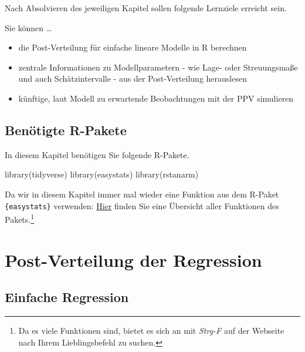 \documentclass[
  a4paper,
  DIV=11]{scrreprt}
\newenvironment{Shaded}{\begin{snugshade}}{\end{snugshade}}
\newcommand{\FunctionTok}[1]{\textcolor[rgb]{0.28,0.35,0.67}{#1}}
\newcommand{\NormalTok}[1]{\textcolor[rgb]{0.00,0.23,0.31}{#1}}
\providecommand{\tightlist}{%
  \setlength{\itemsep}{0pt}\setlength{\parskip}{0pt}}\usepackage{longtable,booktabs,array}
\theoremstyle{definition}
\theoremstyle{remark}
\begin{document}
Nach Absolvieren des jeweiligen Kapitel sollen folgende Lernziele
erreicht sein.

Sie können \ldots{}

\begin{itemize}
\tightlist
\item
  die Post-Verteilung für einfache lineare Modelle in R berechnen
\item
  zentrale Informationen zu Modellparametern - wie Lage- oder
  Streuungsmaße und auch Schätzintervalle - aus der Post-Verteilung
  herauslesen
\item
  künftige, laut Modell zu erwartende Beobachtungen mit der PPV
  simulieren
\end{itemize}

\hypertarget{benuxf6tigte-r-pakete-5}{%
\subsection{Benötigte R-Pakete}\label{benuxf6tigte-r-pakete-5}}

In diesem Kapitel benötigen Sie folgende R-Pakete.

\begin{Shaded}
\begin{Highlighting}[]
\FunctionTok{library}\NormalTok{(tidyverse)}
\FunctionTok{library}\NormalTok{(easystats)}
\FunctionTok{library}\NormalTok{(rstanarm)}
\end{Highlighting}
\end{Shaded}

Da wir in diesem Kapitel immer mal wieder eine Funktion aus dem R-Paket
\texttt{\{easystats\}} verwenden:
\href{https://easystats.github.io/easystats/articles/list_of_functions.html}{Hier}
finden Sie eine Übersicht aller Funktionen des Pakets.\footnote{Da es
  viele Funktionen sind, bietet es sich an mit \emph{Strg-F} auf der
  Webseite nach Ihrem Lieblingsbefehl zu suchen.}

\hypertarget{post-verteilung-der-regression}{%
\section{Post-Verteilung der
Regression}\label{post-verteilung-der-regression}}

\hypertarget{einfache-regression}{%
\subsection{Einfache Regression}\label{einfache-regression}}
\end{document}
